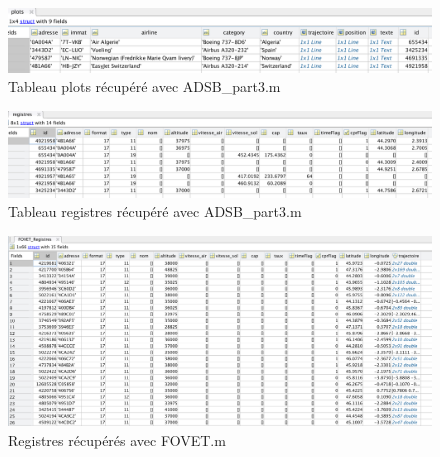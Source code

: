 \documentclass[a4paper, 10pt]{article}
\begin{document}
    \newpage
    \begin{figure}[h!]
    	    \centering
    	    \includegraphics[scale=0.44]{registre_plots.png}
            \caption{Tableau \textsf{plots} récupéré avec \textsf{ADSB\_part3.m}}
    \end{figure}
    
    \begin{figure}[h!]
    	    \centering
    	    \includegraphics[scale=0.38]{registre_part3.png}
            \caption{Tableau \textsf{registres} récupéré avec \textsf{ADSB\_part3.m}}
    \end{figure}
    

    \begin{figure}[h!]
    	    \centering
    	    \includegraphics[scale=0.35]{registres.png}
            \caption{Registres récupérés avec \textsf{FOVET.m}}
    \end{figure}
    \noindent
\end{document}

